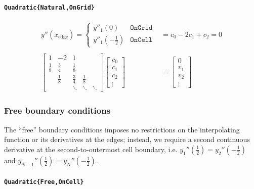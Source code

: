 \documentclass{article}
\begin{document}
\paragraph{\texttt{Quadratic\{Natural,OnGrid\}}}
\begin{align*}
y''(x_{\text{edge}}) = \begin{cases}y''_1(0) & \texttt{OnGrid} \\y''_1(-\frac{1}{2}) & \texttt{OnCell}\end{cases} &= c_0 - 2 c_1 + c_2 = 0 \\
\\
\begin{bmatrix}
1 & -2 & 1 \\
\frac{1}{8} & \frac{3}{4} & \frac{1}{8} \\
 & \frac{1}{8} & \frac{3}{4} & \frac{1}{8} \\
 & & \ddots & \ddots & \ddots
\end{bmatrix}
\begin{bmatrix}c_0\\ c_1\\ c_2\\\vdots\end{bmatrix}
&=
\begin{bmatrix}0\\ v_1 \\ v_2 \\\vdots\end{bmatrix}
\end{align*}

\subsubsection{Free boundary conditions}

The ``free'' boundary conditions imposes no restrictions on the interpolating function or its derivatives at the edges; instead, we require a second continuous derivative at the second-to-outermost cell boundary, i.e. $y_1''(\frac{1}{2}) = y_2''(-\frac{1}{2})$ and $y_{N-1}''(\frac{1}{2}) = y_N''(-\frac{1}{2})$.

\paragraph{\texttt{Quadratic\{Free,OnCell\}}}
\end{document}
